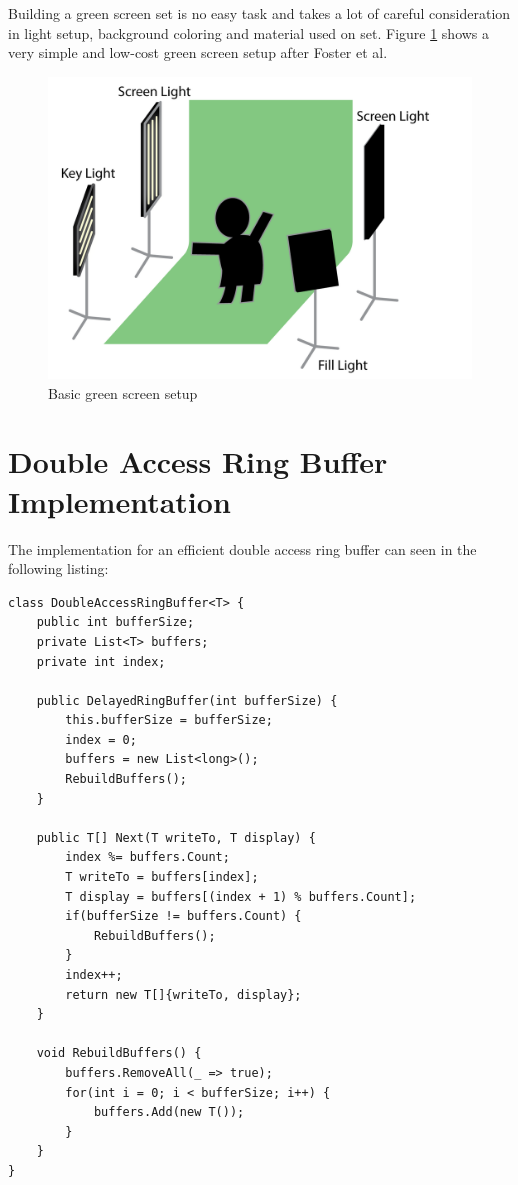 Building a green screen set is no easy task and takes a lot of careful 
consideration in light setup, background coloring and material used on set. 
\newline
Figure \ref{fig:appendix:gs-setup} shows a very simple and low-cost green 
screen setup after Foster et al. \cite{foster:greenscreen:2010}

\begin{figure}[htb]
	\centering
	\includegraphics[width=\textwidth]{gfx/appendix/gs-setup.png}
	\caption{Basic green screen setup}
	\label{fig:appendix:gs-setup}
\end{figure}

\chapter{Double Access Ring Buffer Implementation}
\label{app:darbi}

The implementation for an efficient double access ring buffer can seen in the 
following listing:

\begin{lstlisting}[language={[Sharp]C}]
class DoubleAccessRingBuffer<T> {
	public int bufferSize;
	private List<T> buffers;
	private int index;
	
	public DelayedRingBuffer(int bufferSize) {
		this.bufferSize = bufferSize;
		index = 0;
		buffers = new List<long>();
		RebuildBuffers();
	}
		
	public T[] Next(T writeTo, T display) {
		index %= buffers.Count;
		T writeTo = buffers[index];
		T display = buffers[(index + 1) % buffers.Count];
		if(bufferSize != buffers.Count) {
			RebuildBuffers();
		}
		index++;
		return new T[]{writeTo, display};
	}
	
	void RebuildBuffers() {
		buffers.RemoveAll(_ => true);
		for(int i = 0; i < bufferSize; i++) {
			buffers.Add(new T());
		}
	}
}
\end{lstlisting}

\endgroup
